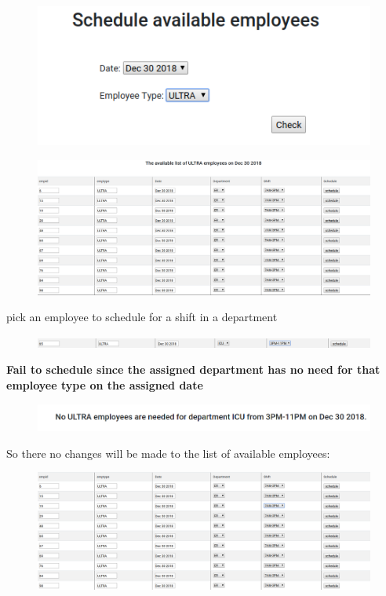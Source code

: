 \documentclass[11pt]{article}
\makeatletter
\def\maxwidth{\ifdim\Gin@nat@width>\linewidth\linewidth
    \else\Gin@nat@width\fi}
\let\Oldincludegraphics\includegraphics
\renewcommand{\includegraphics}[1]{\Oldincludegraphics[width=.8\maxwidth]{#1}}
\makeatother
\begin{document}
    \begin{figure}[H]
\centering
\includegraphics{10.png}
\caption{}
\end{figure}

\begin{figure}[H]
\centering
\includegraphics{11.png}
\caption{}
\end{figure}

\[\]
pick an employee to schedule for a shift in a department

\begin{figure}[H]
\centering
\includegraphics{12.png}
\caption{}
\end{figure}

\textbf{Fail to schedule since the assigned department has no need for
that employee type on the assigned date}

\begin{figure}[H]
\centering
\includegraphics{13.png}
\caption{}
\end{figure}

So there no changes will be made to the list of available employees:

\begin{figure}[H]
\centering
\includegraphics{14.png}
\caption{}
\end{figure}


    
    
    
    
\end{document}
